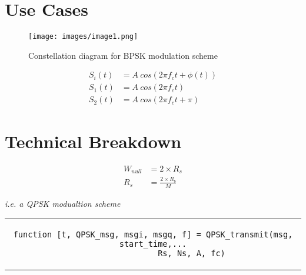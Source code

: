 \documentclass[12pt]{article}
\numberwithin{equation}{section} %
\numberwithin{figure}{section} %
\numberwithin{table}{section} %
\begin{document}
\newpage
\section{Use Cases}
	\begin{wrapfigure}[20]{r}{0.5\textwidth}
		\centering
		\texttt{[image: images/image1.png]}
		\caption{Constellation diagram for BPSK modulation scheme}
		\label{fig:BPSK_diagram}
	\end{wrapfigure}
	
	\begin{align*}
		S_i(t) &= A \ cos(2\pi f_ct + \phi (t)) \\
		S_1(t) &= A \ cos(2\pi f_ct) \\ 
		S_2(t) &= A \ cos (2\pi f_ct+\pi)
	\end{align*}

\newpage
\section{Technical Breakdown}	
	
	\begin{equation}
		\begin{aligned}
			W_{null} &= 2 \times R_s \\
			R_s &= \frac{2 \times R_b}{M}
		\end{aligned}
	\end{equation}
	
	\begin{center}
		\footnotesize\textit{i.e. a QPSK modualtion scheme}\normalfont
	\end{center}

	\begin{center}
		\begin{tabular}{c}
			\begin{lstlisting}[linewidth = 15cm, name = Thomas Nugent]
				function [t, QPSK_msg, msgi, msgq, f] = QPSK_transmit(msg, start_time,...
				Rs, Ns, A, fc)
				\end{lstlisting}
		\end{tabular}
	\end{center}
\end{document}
